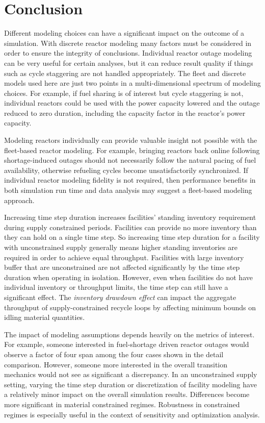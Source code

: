 \documentclass{style}
\begin{document}
\section{Conclusion}

Different modeling choices can have a significant impact on the outcome of a
simulation.  With discrete reactor modeling many factors must be considered in
order to ensure the integrity of conclusions.  Individual reactor outage
modeling can be very useful for certain analyses, but it can reduce result
quality if things such as cycle staggering are not handled appropriately.  The
fleet and discrete models used here are just two points in a multi-dimensional
spectrum of modeling choices. For example, if fuel sharing is of interest but cycle
staggering is not, individual reactors could be used with the power capacity
lowered and the outage reduced to zero duration, including the capacity factor
in the reactor's power capacity.

Modeling reactors individually can provide valuable insight not possible with
the fleet-based reactor modeling.  For example, bringing reactors back online
following shortage-induced outages should not necessarily follow the natural
pacing of fuel availability, otherwise refueling cycles become
unsatisfactorily synchronized.  If individual reactor modeling fidelity is not
required, then performance benefits in both simulation run time and data
analysis may suggest a fleet-based modeling approach.

Increasing time step duration increases facilities' standing inventory
requirement during supply constrained periods.  Facilities can provide no more
inventory than they can hold on a single time step.  So increasing time step
duration for a facility with unconstrained supply generally means higher
standing inventories are required in order to achieve equal throughput.
Facilities with large inventory buffer that are unconstrained are not affected
significantly by the time step duration when operating in isolation.  However,
even when facilities do not have individual inventory or throughput limits,
the time step can still have a significant effect. The \emph{inventory drawdown
effect} can impact the aggregate throughput of supply-constrained recycle loops by affecting
minimum bounds on idling material quantities.

The impact of modeling assumptions depends heavily on the metrics of interest.
For example, someone interested in fuel-shortage driven reactor outages would
observe a factor of four span among the four cases shown in the detail
comparison.  However, someone more interested in the overall transition
mechanics would not see as significant a discrepancy.  In an unconstrained
supply setting, varying the time step duration or discretization of facility
modeling have a relatively minor impact on the overall simulation results.
Differences become more significant in material constrained regimes.
Robustness in constrained regimes is especially useful in the context of
sensitivity and optimization analysis.
\end{document}
